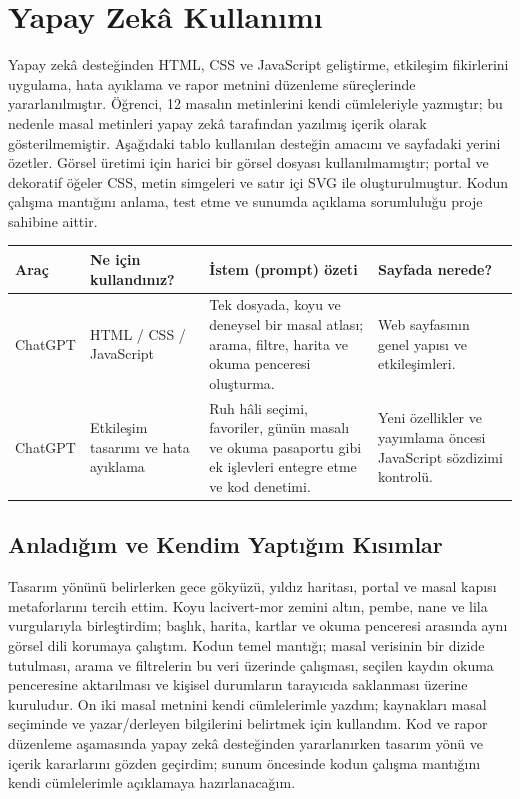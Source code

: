 \documentclass[12pt,a4paper]{article}
\begin{document}
\section{Yapay Zekâ Kullanımı}
Yapay zekâ desteğinden HTML, CSS ve JavaScript geliştirme, etkileşim fikirlerini uygulama, hata ayıklama ve rapor metnini düzenleme süreçlerinde yararlanılmıştır. Öğrenci, 12 masalın metinlerini kendi cümleleriyle yazmıştır; bu nedenle masal metinleri yapay zekâ tarafından yazılmış içerik olarak gösterilmemiştir. Aşağıdaki tablo kullanılan desteğin amacını ve sayfadaki yerini özetler. Görsel üretimi için harici bir görsel dosyası kullanılmamıştır; portal ve dekoratif öğeler CSS, metin simgeleri ve satır içi SVG ile oluşturulmuştur. Kodun çalışma mantığını anlama, test etme ve sunumda açıklama sorumluluğu proje sahibine aittir.

\begin{longtable}{@{}p{2.6cm}p{3.6cm}p{4.2cm}p{3.4cm}@{}}
\toprule
\textbf{Araç} & \textbf{Ne için kullandınız?} & \textbf{İstem (prompt) özeti} & \textbf{Sayfada nerede?} \\
\midrule
\endhead
ChatGPT & HTML / CSS / JavaScript & Tek dosyada, koyu ve deneysel bir masal atlası; arama, filtre, harita ve okuma penceresi oluşturma. & Web sayfasının genel yapısı ve etkileşimleri. \\
ChatGPT & Etkileşim tasarımı ve hata ayıklama & Ruh hâli seçimi, favoriler, günün masalı ve okuma pasaportu gibi ek işlevleri entegre etme ve kod denetimi. & Yeni özellikler ve yayımlama öncesi JavaScript sözdizimi kontrolü. \\
\bottomrule
\end{longtable}

\subsection{Anladığım ve Kendim Yaptığım Kısımlar}
Tasarım yönünü belirlerken gece gökyüzü, yıldız haritası, portal ve masal kapısı metaforlarını tercih ettim. Koyu lacivert-mor zemini altın, pembe, nane ve lila vurgularıyla birleştirdim; başlık, harita, kartlar ve okuma penceresi arasında aynı görsel dili korumaya çalıştım. Kodun temel mantığı; masal verisinin bir dizide tutulması, arama ve filtrelerin bu veri üzerinde çalışması, seçilen kaydın okuma penceresine aktarılması ve kişisel durumların tarayıcıda saklanması üzerine kuruludur. On iki masal metnini kendi cümlelerimle yazdım; kaynakları masal seçiminde ve yazar/derleyen bilgilerini belirtmek için kullandım. Kod ve rapor düzenleme aşamasında yapay zekâ desteğinden yararlanırken tasarım yönü ve içerik kararlarını gözden geçirdim; sunum öncesinde kodun çalışma mantığını kendi cümlelerimle açıklamaya hazırlanacağım.
\end{document}
